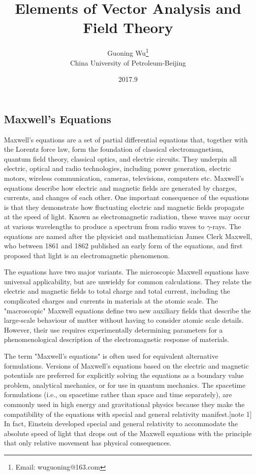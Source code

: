\documentclass[a4paper,12pt]{article}
\begin{document}
\begin{CJK}{UTF8}{gbsn}
\title{Elements of Vector Analysis and Field Theory}
\author{Guoning Wu\footnote{Email: wuguoning@163.com}\\[2ex]
 China University of Petroleum-Beijing\\[2ex]}
\date{2017.9}
\maketitle

\section{Maxwell's Equations}
Maxwell's equations are a set of partial differential equations that, 
together with the Lorentz force law, form the foundation of classical 
electromagnetism, quantum field theory, classical optics, and electric 
circuits. They underpin all electric, optical and radio technologies, 
including power generation, electric motors, wireless communication, 
cameras, televisions, computers etc. Maxwell's equations describe how 
electric and magnetic fields are generated by charges, currents, and 
changes of each other. One important consequence of the equations is 
that they demonstrate how fluctuating electric and magnetic fields 
propagate at the speed of light. Known as electromagnetic radiation, 
these waves may occur at various wavelengths to produce a spectrum 
from radio waves to $\gamma$-rays. The equations are named after the 
physicist and mathematician James Clerk Maxwell, who between 1861 and 
1862 published an early form of the equations, and first proposed 
that light is an electromagnetic phenomenon.

The equations have two major variants. The microscopic Maxwell equations 
have universal applicability, but are unwieldy for common calculations. 
They relate the electric and magnetic fields to total charge and total 
current, including the complicated charges and currents in materials 
at the atomic scale. The "macroscopic" Maxwell equations define two 
new auxiliary fields that describe the large-scale behaviour of matter 
without having to consider atomic scale details. However, their use 
requires experimentally determining parameters for a phenomenological 
description of the electromagnetic response of materials.

The term "Maxwell's equations" is often used for equivalent alternative 
formulations. Versions of Maxwell's equations based on the electric and 
magnetic potentials are preferred for explicitly solving the equations 
as a boundary value problem, analytical mechanics, or for use in quantum 
mechanics. The spacetime formulations (i.e., on spacetime rather than 
space and time separately), are commonly used in high energy and 
gravitational physics because they make the compatibility of the equations 
with special and general relativity manifest.[note 1] In fact, 
Einstein developed special and general relativity to accommodate 
the absolute speed of light that drops out of the Maxwell equations 
with the principle that only relative movement has physical consequences.


\end{CJK}
\end{document}
